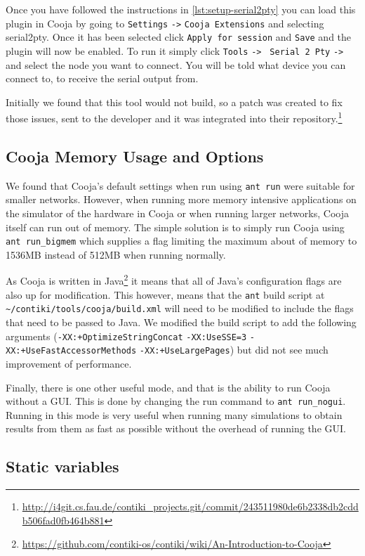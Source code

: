 Once you have followed the instructions in \autoref{lst:setup-serial2pty} you can load this plugin in Cooja by going to \verb|Settings| \verb|->| \verb|Cooja Extensions| and selecting serial2pty. Once it has been selected click \verb|Apply for session| and \verb|Save| and the plugin will now be enabled. To run it simply click \verb|Tools| \verb|->| \verb| Serial 2 Pty| \verb|->| and select the node you want to connect. You will be told what device you can connect to, to receive the serial output from.

Initially we found that this tool would not build, so a patch was created to fix those issues, sent to the developer and it was integrated into their repository.\footnote{\url{http://i4git.cs.fau.de/contiki\_projects.git/commit/243511980de6b2338db2cddb506fad0fb464b881}}

\subsection{Cooja Memory Usage  and Options}

We found that Cooja's default settings when run using \verb|ant run| were suitable for smaller networks. However, when running more memory intensive applications on the simulator of the hardware in Cooja or when running larger networks, Cooja itself can run out of memory. The simple solution is to simply run Cooja using \verb|ant run_bigmem| which supplies a flag limiting the maximum about of memory to 1536MB instead of 512MB when running normally.

As Cooja is written in Java\footnote{\url{https://github.com/contiki-os/contiki/wiki/An-Introduction-to-Cooja}} it means that all of Java's configuration flags are also up for modification. This however, means that the \verb|ant| build script at \verb|~/contiki/tools/cooja/build.xml| will need to be modified to include the flags that need to be passed to Java. We modified the build script to add the following arguments (\verb|-XX:+OptimizeStringConcat| \verb|-XX:UseSSE=3| \verb|-XX:+UseFastAccessorMethods| \verb|-XX:+UseLargePages|) but did not see much improvement of performance.

Finally, there is one other useful mode, and that is the ability to run Cooja without a GUI. This is done by changing the run command to \verb|ant run_nogui|. Running in this mode is very useful when running many simulations to obtain results from them as fast as possible without the overhead of running the GUI.


\subsection{Static variables}

